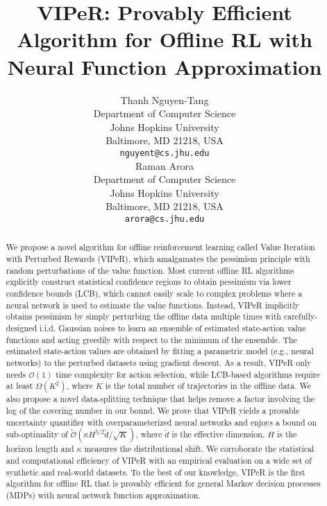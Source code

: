 \documentclass{article} \usepackage{iclr2023/iclr2023_conference,times}
\title{VIPeR: Provably Efficient Algorithm for Offline RL with Neural Function Approximation}
\author{Thanh Nguyen-Tang \\
Department of Computer Science\\
Johns Hopkins University\\
Baltimore, MD 21218, USA \\
\texttt{nguyent@cs.jhu.edu} \\
\And
Raman Arora \\
Department of Computer Science\\
Johns Hopkins University\\
Baltimore, MD 21218, USA \\
\texttt{arora@cs.jhu.edu} \\
}
\begin{document}
\maketitle

\begin{abstract}
We propose a novel algorithm for offline reinforcement learning called Value Iteration with Perturbed Rewards (VIPeR), which amalgamates the pessimism principle with random perturbations of the value function. Most current offline RL algorithms explicitly construct statistical confidence regions to obtain pessimism via lower confidence bounds (LCB), which cannot easily scale to complex problems where a neural network is used to estimate the value functions. Instead, VIPeR implicitly obtains pessimism by simply perturbing the offline data multiple times with carefully-designed i.i.d. Gaussian noises to learn an ensemble of estimated state-action {value functions} and acting greedily with respect to the minimum of the ensemble. The estimated state-action values are obtained by fitting a parametric model (e.g., neural networks) to the perturbed datasets using gradient descent. As a result, VIPeR only needs $\mathcal{O}(1)$ time complexity for action selection, while LCB-based algorithms require at least $\Omega(K^2)$, where $K$ is the total number of trajectories in the offline data. We also propose a novel data-splitting technique that helps remove a factor involving the log of the covering number in our bound. We prove that VIPeR yields a provable uncertainty quantifier with overparameterized neural networks and enjoys a bound on sub-optimality of $\tilde{\mathcal{O}}(  { \kappa H^{5/2}  \tilde{d} }/{\sqrt{K}})$, where $\tilde{d}$ is the effective dimension, $H$ is the horizon length and $\kappa$ measures the distributional shift. We corroborate the statistical and computational efficiency of VIPeR with an empirical evaluation on a wide set of synthetic and real-world datasets. To the best of our knowledge, VIPeR is the first algorithm for offline RL that is provably efficient for general Markov decision processes (MDPs) with neural network function approximation. 



%
 \end{abstract}
\end{document}
